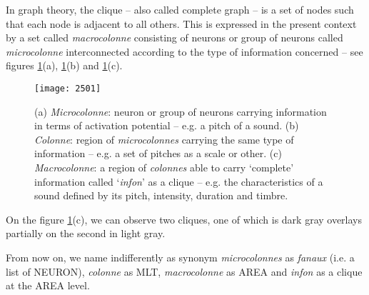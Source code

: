 In graph theory, the clique -- also called complete graph -- is a set of nodes such that each node is adjacent to all others. This is expressed in the present context by a set called \textit{macrocolonne} consisting of neurons or group of neurons called \textit{microcolonne} interconnected according to the type of information concerned -- see figures \ref{fig:cli}(a), \ref{fig:cli}(b) and \ref{fig:cli}(c).

\begin{figure}[htbp]
\begin{center}
\texttt{[image: 2501]}
\caption{(a) \textit{Microcolonne}: neuron or group of neurons carrying information in terms of activation potential -- e.g. a pitch of a sound. (b) \textit{Colonne}: region of \textit{microcolonnes} carrying the same type of information -- e.g. a set of pitches as a scale or other. (c) \textit{Macrocolonne}: a region of \textit{colonnes} able to carry `complete' information called `\textit{infon}' as a clique -- e.g. the characteristics of a sound defined by its pitch, intensity, duration and timbre.}
\label{fig:cli}
\end{center}
\end{figure}

On the figure \ref{fig:cli}(c), we can observe two cliques, one of which is dark gray overlays partially on the second in light gray.

\bigskip

From now on, we name indifferently as synonym \textit{microcolonnes} as \textit{fanaux} (i.e. a list of NEURON),  \textit{colonne} as MLT, \textit{macrocolonne} as AREA and \textit{infon} as a clique at the AREA level.